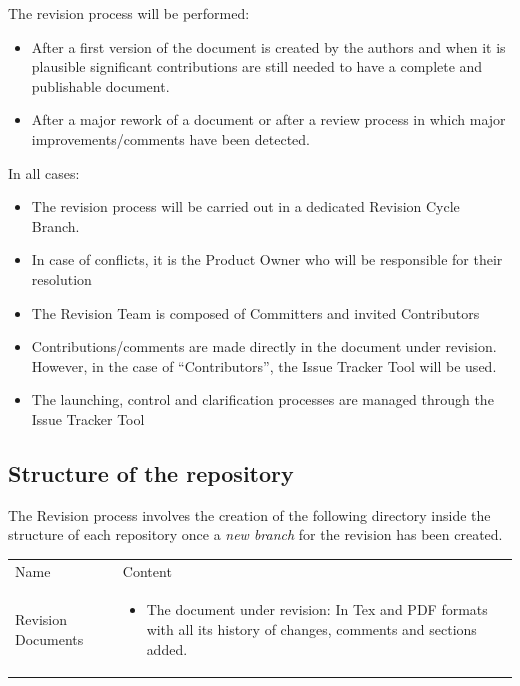 \documentclass{template/openetcs_article}
\begin{document}
The revision process will be performed:
\begin{itemize}
\item After a first version of the document is created by the authors and when it is plausible significant contributions are still needed to have a complete and publishable document.
\item After a major rework of a document or after a review process in which major improvements/comments have been detected.
\end{itemize}
In all cases:
\begin{itemize}
\item The revision process will be carried out in a dedicated Revision Cycle Branch.
\item In case of conflicts, it is the Product Owner who will be responsible for their resolution
\item The Revision Team is composed of Committers and invited Contributors
\item Contributions/comments are made directly in the document under revision. However, in the case of “Contributors”, the Issue Tracker Tool will be used.
\item The launching, control and clarification processes are managed through the Issue Tracker Tool
\end{itemize}

\subsection{Structure of the repository}
 
The Revision process involves the creation of the following directory inside the structure of each repository once a {\it new branch} for the revision has been created.

\begin{flushleft}
\begin{tabular}{|m{3cm}|m{11cm}|}
\hline
\rowcolor{myblue}
\multicolumn{2}{|c|}{Structure of the repository} \\\hline
\rowcolor{lightgray}
Name &
Content 
\\\hline
Revision Documents &
\begin{itemize}
\item The document under revision: In Tex and PDF formats with all its history of changes, comments and sections added.
\end{itemize}\\\hline
\end{tabular}
\end{flushleft}
\end{document}
